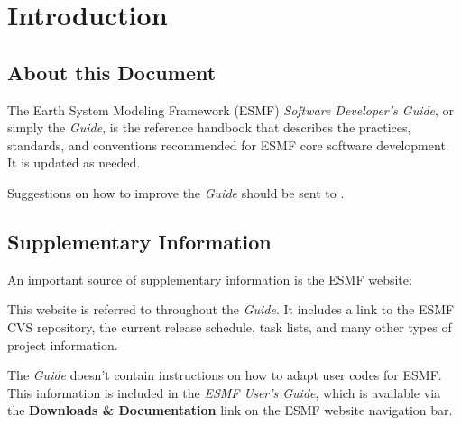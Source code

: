 
\section{Introduction}
\label{sec:intro}

\subsection{About this Document}
The Earth System Modeling Framework (ESMF) {\it Software Developer's Guide},
or simply the {\it Guide}, is the reference handbook that describes
the practices, standards, and conventions recommended for ESMF core software
development.  It is updated as needed.

Suggestions on how to improve the {\it Guide} should be sent to 
.

\subsection{Supplementary Information}
An important source of supplementary information is the ESMF website:
\begin{center}
\end{center}
This website is referred to throughout the {\it Guide}.  
It includes a link to the ESMF CVS repository, the current release
schedule, task lists, and many other types of project information.

The {\it Guide} doesn't contain instructions on how to adapt user
codes for ESMF.  This information is included in the {\it ESMF User's
Guide}\cite{bib:ESMFusrdoc}, which is available via the {\bf Downloads \& Documentation} link on the ESMF website navigation bar.

